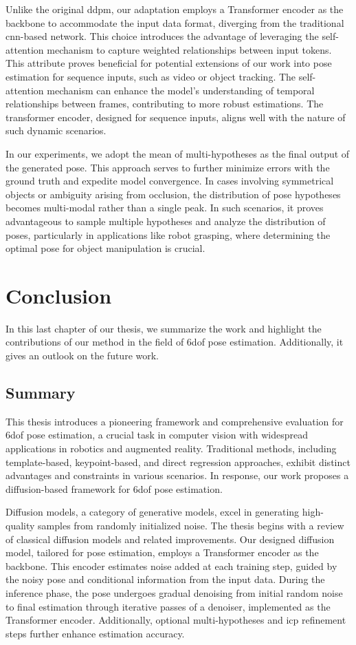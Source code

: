 \documentclass[12pt,DIV14,BCOR12mm,a4paper,footinclude=false,headinclude,parskip=half-,twoside,openright,cleardoublepage=empty,toc=index,bibliography=totoc,listof=totoc]{scrreprt}
\numberwithin{equation}{chapter}
\begin{document}
Unlike the original \gls{ddpm}, our adaptation employs a Transformer encoder as the backbone to accommodate the input data format, diverging from the traditional \gls{cnn}-based network. This choice introduces the advantage of leveraging the self-attention mechanism to capture weighted relationships between input tokens. This attribute proves beneficial for potential extensions of our work into pose estimation for sequence inputs, such as video or object tracking. The self-attention mechanism can enhance the model's understanding of temporal relationships between frames, contributing to more robust estimations. The transformer encoder, designed for sequence inputs, aligns well with the nature of such dynamic scenarios.

In our experiments, we adopt the mean of multi-hypotheses as the final output of the generated pose. This approach serves to further minimize errors with the ground truth and expedite model convergence. In cases involving symmetrical objects or ambiguity arising from occlusion, the distribution of pose hypotheses becomes multi-modal rather than a single peak. In such scenarios, it proves advantageous to sample multiple hypotheses and analyze the distribution of poses, particularly in applications like robot grasping, where determining the optimal pose for object manipulation is crucial.

\chapter{Conclusion}
In this last chapter of our thesis, we summarize the work and highlight the contributions of our method in the field of \gls{6dof} pose estimation. Additionally, it gives an outlook on the future work.
\section{Summary}
This thesis introduces a pioneering framework and comprehensive evaluation for \gls{6dof} pose estimation, a crucial task in computer vision with widespread applications in robotics and augmented reality. Traditional methods, including template-based, keypoint-based, and direct regression approaches, exhibit distinct advantages and constraints in various scenarios. In response, our work proposes a diffusion-based framework for \gls{6dof} pose estimation.

Diffusion models, a category of generative models, excel in generating high-quality samples from randomly initialized noise. The thesis begins with a review of classical diffusion models and related improvements. Our designed diffusion model, tailored for pose estimation, employs a Transformer encoder as the backbone. This encoder estimates noise added at each training step, guided by the noisy pose and conditional information from the input data. During the inference phase, the pose undergoes gradual denoising from initial random noise to final estimation through iterative passes of a denoiser, implemented as the Transformer encoder. Additionally, optional multi-hypotheses and \gls{icp} refinement steps further enhance estimation accuracy.
\end{document}
